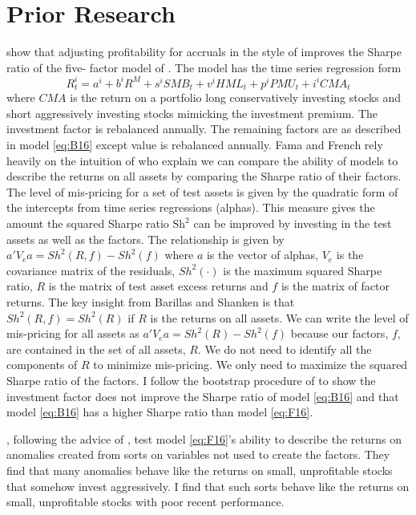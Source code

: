 
\section*{Prior Research}

\textcite{fama2016choosing} show that adjusting profitability for accruals in
the style of \textcite{ball2016accruals} improves the Sharpe ratio of the five-
factor model of \textcite{fama2015five}.
The model has the time series regression form
\begin{equation} \label{eq:F16}
R_t^i = a^i+b^iR^M+s^iSMB_t+v^iHML_t+p^iPMU_t+i^iCMA_t
\end{equation}
where $CMA$ is the return on a portfolio long conservatively investing stocks
and short aggressively investing stocks mimicking the investment premium.
The investment factor is rebalanced annually.
The remaining factors are as described in model \ref{eq:B16} except value is
rebalanced annually.
Fama and French rely heavily on the intuition of \textcite{barillas2016alpha}
who explain we can compare the ability of models to describe the returns on all
assets by comparing the Sharpe ratio of their factors.
The level of mis-pricing for a set of test assets is given by the quadratic
form of the intercepts from time series regressions (alphas).
This measure gives the amount the squared Sharpe ratio $\text{Sh}^2$ can be
improved by investing in the test assets as well as the factors.
The relationship is given by $a'V_ea=Sh^2\left(R,f\right)-Sh^2\left(f\right)$
where $a$ is the vector of alphas, $V_e$ is the covariance matrix of the
residuals, $Sh^2\left(\cdot\right)$ is the maximum squared Sharpe ratio, $R$ is
the matrix of test asset excess returns and $f$ is the matrix of factor
returns.
The key insight from Barillas and Shanken is that
$Sh^2\left(R,f\right)=Sh^2\left(R\right)$ if $R$ is the returns on all assets.
We can write the level of mis-pricing for all assets as
$a'V_ea=Sh^2\left(R\right)-Sh^2\left(f\right)$ because our factors, $f$, are
contained in the set of all assets, $R$.
We do not need to identify all the components of $R$ to minimize mis-pricing.
We only need to maximize the squared Sharpe ratio of the factors.
I follow the bootstrap procedure of \textcite{fama2016choosing} to show the
investment factor does not improve the Sharpe ratio of model \ref{eq:B16} and
that model \ref{eq:B16} has a higher Sharpe ratio than model \ref{eq:F16}.

\textcite{fama2016dissecting}, following the advice of
\textcite{lewellen2010skeptical}, test model \ref{eq:F16}'s ability to describe
the returns on anomalies created from sorts on variables not used to create the
factors. They find that many anomalies
behave like the returns on small, unprofitable stocks that
somehow invest aggressively. I find that such sorts behave like the returns on
small, unprofitable stocks with poor recent performance.

